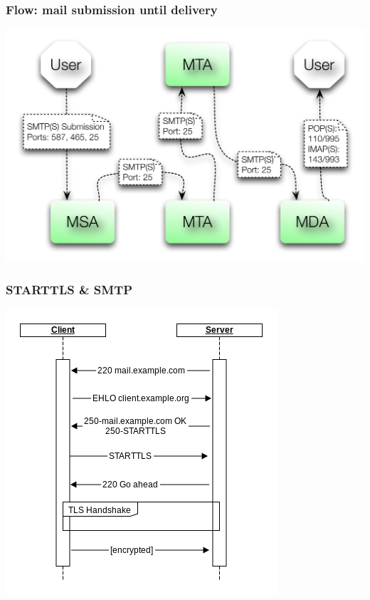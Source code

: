 \documentclass[14pt,aspectratio=43]{beamer}
\begin{document}
\begin{frame}
  \frametitle{Flow: mail submission until delivery}
  \begin{center}
     \includegraphics*[scale=0.7]{images/mail_flow.png}
  \end{center}
\end{frame}

\begin{frame}
  \frametitle{STARTTLS \& SMTP}
  \begin{center}
    \includegraphics*[scale=0.5]{images/smtp_handshake.png}
  \end{center}
\end{frame}
\end{document}

